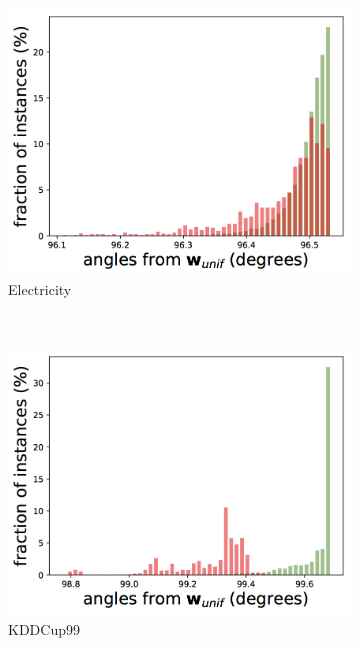 \documentclass{article} %
\begin{document}
\begin{figure}[h]
	\begin{subfigure}[b]{0.23\textwidth}
		\includegraphics[width=\textwidth]{angles/angles_electricity_iforest.png}
		\caption{Electricity}
		\label{fig:angles_electricity}
	\end{subfigure}
	~
	\begin{subfigure}[b]{0.23\textwidth}
		\includegraphics[width=\textwidth]{angles/angles_kddcup_iforest.png}
		\caption{KDDCup99}
		\label{fig:angles_kddcup}
	\end{subfigure}
	~
	\begin{subfigure}[b]{0.23\textwidth}

\end{subfigure}
\end{figure}
\end{document}
